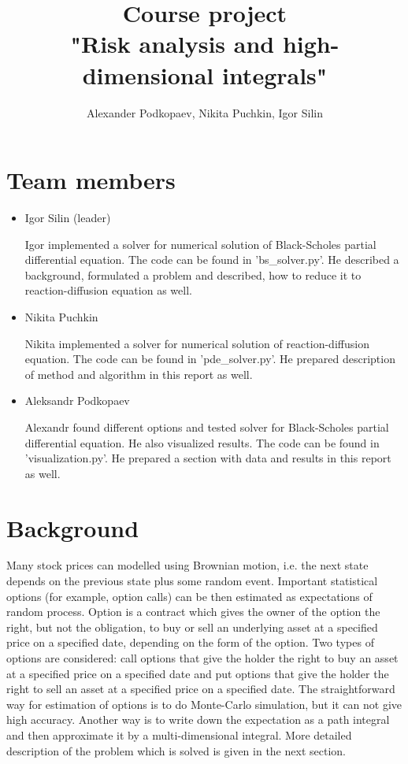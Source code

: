 \documentclass[11pt,a4paper]{extarticle}
\title{Course project \\
"Risk analysis and high-dimensional integrals"}
\author{Alexander Podkopaev, Nikita Puchkin, Igor Silin}
\begin{document}
\maketitle

\section{Team members}

\begin{itemize}

\item Igor Silin (leader)

Igor implemented a solver for numerical solution of Black-Scholes partial differential equation.
The code can be found in 'bs\_solver.py'.
He described a background, formulated a problem and described, how to reduce it to reaction-diffusion equation as well.

\item Nikita Puchkin

Nikita implemented a solver for numerical solution of reaction-diffusion equation.
The code can be found in 'pde\_solver.py'.
He prepared description of method and algorithm in this report as well.

\item Aleksandr Podkopaev

Alexandr found different options and tested solver for Black-Scholes partial differential equation.
He also visualized results.
The code can be found in 'visualization.py'.
He prepared a section with data and results in this report as well.

\end{itemize}

\section{Background}

Many stock prices can modelled using Brownian motion, i.e. the next state depends on the previous state plus some random event. Important statistical options (for example, option calls) can be then estimated as expectations of random process. Option is a contract which gives the owner of the option the right, but not the obligation, to buy or sell an underlying asset at a specified price on a specified date, depending on the form of the option. Two types of options are considered: call options that give the holder the right to buy an asset at a specified price on a specified date and put options that give the holder the right to sell an asset at a specified price on a specified date. The straightforward way for estimation of options is to do Monte-Carlo simulation, but it can not give high accuracy. Another way is to write down the expectation as a path integral and then approximate it by a multi-dimensional integral. More detailed description of the problem which is solved is given in the next section.
\end{document}
